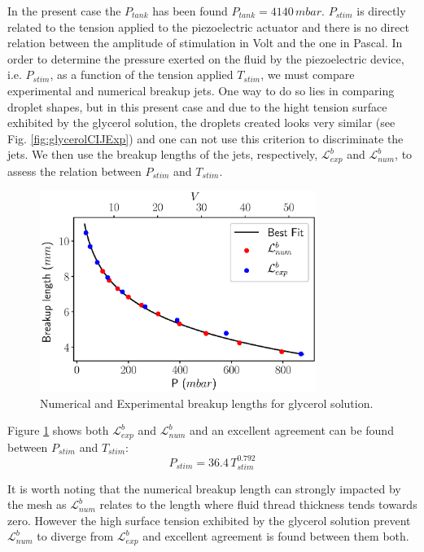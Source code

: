 \documentclass[twocolumn,10pt]{asme2ej}
\begin{document}
In the present case the $P_{tank}$ has been found $P_{tank}=4140 \, mbar$. 
$P_{stim}$ is directly related to the tension applied to the piezoelectric actuator and there is no direct relation between the amplitude of stimulation in Volt and the one in Pascal. In order to determine the pressure exerted on the fluid by the piezoelectric device, i.e. $P_{stim}$, as a function of the tension applied $T_{stim}$, we must compare experimental and numerical breakup jets. One way to do so lies in comparing droplet shapes, but in this present case and due to the hight tension surface exhibited by the glycerol solution, the droplets created looks very similar (see Fig. \ref{fig:glycerolCIJExp}) and one can not use this criterion to discriminate the jets. We then use the breakup lengths of the jets, respectively, $\mathcal{L}_{exp}^b$ and $\mathcal{L}_{num}^b$, to assess the relation between $P_{stim}$ and $T_{stim}$. 

\begin{figure}[]
    \centering
    \includegraphics[width=9cm]{LbGlycerol.eps}
    \caption{Numerical and Experimental breakup lengths for glycerol solution.}
    \label{fig:LbGlycerol}
\end{figure}

Figure \ref{fig:LbGlycerol} shows both $\mathcal{L}_{exp}^b$ and $\mathcal{L}_{num}^b$ and an excellent agreement can be found between $P_{stim}$ and $T_{stim}$:
\begin{equation}
    P_{stim} = 36.4 \, T_{stim}^{0.792}
\end{equation}

It is worth noting that the numerical breakup length can strongly impacted by the mesh as $\mathcal{L}_{num}^b$ relates to the length where fluid thread thickness tends towards zero. However the high surface tension exhibited by the glycerol solution prevent $\mathcal{L}_{num}^b$ to diverge from $\mathcal{L}_{exp}^b$ and excellent agreement is found between them both. 
\end{document}

